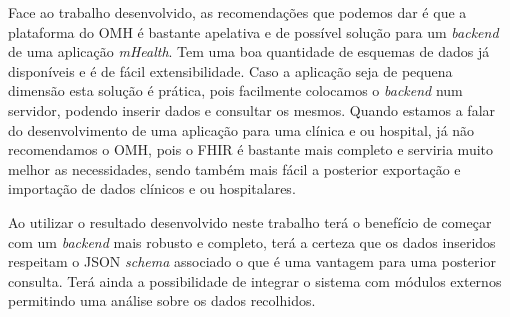 Face ao trabalho desenvolvido, as recomendações que podemos dar é que a plataforma do \gls{OMH} é bastante apelativa e de possível solução para um \textit{backend} de uma aplicação \textit{mHealth}. Tem uma boa quantidade de esquemas de dados já disponíveis e é de fácil extensibilidade. Caso a aplicação seja de pequena dimensão esta solução é prática, pois facilmente colocamos o \textit{backend} num servidor, podendo inserir dados e consultar os mesmos. Quando estamos a falar do desenvolvimento de uma aplicação para uma clínica e ou hospital, já não recomendamos o \gls{OMH}, pois o \gls{FHIR} é bastante mais completo e serviria muito melhor as necessidades, sendo também mais fácil a posterior exportação e importação de dados clínicos e ou hospitalares. \par
Ao utilizar o resultado desenvolvido neste trabalho terá o benefício de começar com um \textit{backend} mais robusto e completo, terá a certeza que os dados inseridos respeitam o \gls{JSON} \textit{schema} associado o que é uma vantagem para uma posterior consulta. Terá ainda a possibilidade de integrar o sistema com módulos externos permitindo uma análise sobre os dados recolhidos.


\cleardoublepage
